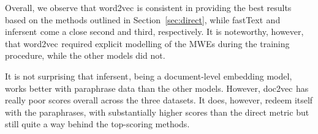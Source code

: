 \documentclass[11pt,a4paper]{article}
\newcommand{\embmethod}[2][]{\textsf{#2}$_{\text{#1}}$\xspace}
\newcommand{\wordtovec}{\embmethod{word2vec}}
\newcommand{\infersent}[1][]{\embmethod[#1]{infersent}}
\newcommand{\doctovec}{\embmethod{doc2vec}}
\newcommand{\fasttext}{\embmethod{fastText}}
\newcommand{\secref}[2][]{Section#1~\ref{#2}\xspace}
\begin{document}
Overall, we observe that \wordtovec is consistent in providing the best results based on the methods outlined in \secref{sec:direct}, while \fasttext and \infersent come a close second and third, respectively. It is noteworthy, however, that \wordtovec required explicit modelling of the MWEs during the training procedure, while the other models did not.





It is not surprising that \infersent, being a document-level embedding model, works better with paraphrase data than the other models. However, \doctovec has really poor scores overall across the three datasets. It does, however, redeem itself with the paraphrases, with substantially higher scores than the direct metric but still quite a way behind the top-scoring methods. 
\end{document}
